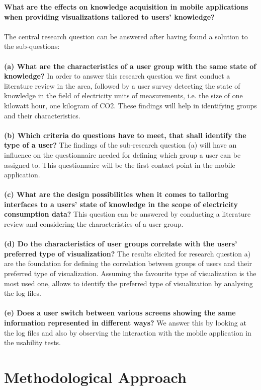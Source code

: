 \documentclass[12pt,a4paper,titlepage,oneside]{article}
\begin{document}
\textbf{What are the effects on knowledge acquisition in mobile applications when providing visualizations tailored to users' knowledge?}
\\\\
The central research question can be answered after having found a solution to the sub-questions:\\\\
\textbf{(a) What are the characteristics of a user group with the same state of knowledge?}
In order to answer this research question we first conduct a literature review in the area, followed by a user survey detecting the state of knowledge in the field of electricity units of measurements, i.e. the size of one kilowatt hour, one kilogram of CO2. These findings will help in identifying groups and their characteristics.\\\\
\textbf{(b) Which criteria do questions have to meet, that shall identify the type of a user?}
The findings of the sub-research question (a) will have an influence on the questionnaire needed for defining which group a user can be assigned to. This questionnaire will be the first contact point in the mobile application.
\\\\
\textbf{(c) What are the design possibilities when it comes to tailoring interfaces to a users' state of knowledge in the scope of electricity consumption data?}
This question can be answered by conducting a literature review and considering the characteristics of a user group.
\\\\
\textbf{(d) Do the characteristics of user groups correlate with the users' preferred type of visualization?}
The results elicited for research question a) are the foundation for defining the correlation between groups of users and their preferred type of visualization. Assuming the favourite type of visualization is the most used one, allows to identify the preferred type of visualization by analysing the log files.
\\\\
\textbf{(e) Does a user switch between various screens showing the same information represented in different ways?}
We answer this by looking at the log files and also by observing the interaction with the mobile application in the usability tests.

\section{Methodological Approach}
\end{document}
